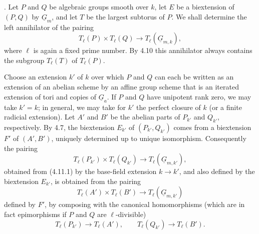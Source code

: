 
\medskip
{}.  Let $P$ and $Q$ be algebraic groups smooth over
$k$, let $E$ be a biextension of $(P,Q)$ by $\underline G_m$, and
let $T$ be the largest subtorus of $P$.  We shall determine the left
annihilator of the pairing
\begin{equation}\tag{4.11.1}
 T_\ell(P)\times T_\ell(Q)
 \longrightarrow T_\ell(\underline G_{m,k}),
\end{equation}
where $\ell$ is again a fixed prime number.  By 4.10 this annihilator
always contains the subgroup $T_\ell(T)$ of $T_\ell(P)$.

Choose an extension $k'$ of $k$ over which $P$ and $Q$ can each be
written as an extension of an abelian scheme by an affine group
scheme that is an iterated extension of tori and copies of
$\underline G_a$.  If $P$ and $Q$ have unipotent rank zero, we may
take $k'=k$; in general, we may take for $k'$ the perfect closure of
$k$ (or a finite radicial extension).  Let $A'$ and $B'$ be the
abelian parts of $P_{k'}$ and $Q_{k'}$, respectively.  By 4.7, the
biextension $E_{k'}$ of $(P_{k'},Q_{k'})$ comes from a biextension
$F'$ of $(A',B')$, uniquely determined up to unique isomorphism.
Consequently the pairing
\begin{equation}\tag{4.11.2}
 T_\ell(P_{k'})\times T_\ell(Q_{k'})
 \longrightarrow T_\ell(\underline G_{m,k'}),
\end{equation}
obtained from (4.11.1) by the base-field extension $k\to k'$, and
also defined by the biextension $E_{k'}$, is obtained from the
pairing
\begin{equation}\tag{4.11.3}
 T_\ell(A')\times T_\ell(B')
 \longrightarrow T_\ell(\underline G_{m,k'})
\end{equation}
defined by $F'$, by composing with the canonical homomorphisms
(which are in fact epimorphisms if $P$ and $Q$ are
$\ell$-divisible)
\begin{equation}\tag{4.11.4}
 T_\ell(P_{k'})\longrightarrow T_\ell(A'),
 \qquad
 T_\ell(Q_{k'})\longrightarrow T_\ell(B').
\end{equation}

